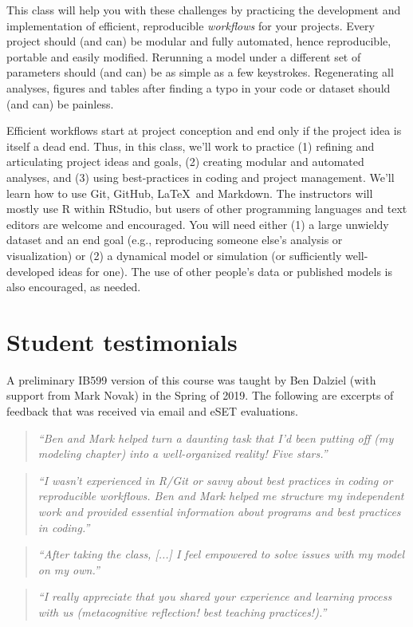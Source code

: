 \documentclass[10pt]{article}
\begin{document}
This class will help you with these challenges by practicing the development and implementation of efficient, reproducible \emph{workflows} for your projects.  Every project should (and can) be modular and fully automated, hence reproducible, portable and easily modified.  Rerunning a model under a different set of parameters should (and can) be as simple as a few keystrokes. Regenerating all analyses, figures and tables after finding a typo in your code or dataset should (and can) be painless.

Efficient workflows start at project conception and end only if the project idea is itself a dead end.  Thus, in this class, we'll work to practice (1) refining and articulating project ideas and goals, (2) creating modular and automated analyses, and (3) using best-practices in coding and project management. We'll learn how to use Git, GitHub, \LaTeX\, and Markdown.  The instructors will mostly use \textsf{R} within RStudio, but users of other programming languages and text editors are welcome and encouraged.  You will need either (1) a large unwieldy dataset and an end goal (e.g., reproducing someone else's analysis or visualization) or (2) a dynamical model or simulation (or sufficiently well-developed ideas for one).  The use of other people's data or published models is also encouraged, as needed.

\section*{Student testimonials}
A preliminary IB599 version of this course was taught by Ben Dalziel (with support from Mark Novak) in the Spring of 2019.  The following are excerpts of feedback that was received via email and eSET evaluations.

\begin{quote}
\emph{``Ben and Mark helped turn a daunting task that I'd been putting off (my modeling chapter) into a well-organized reality! Five stars.''}
\end{quote}
\begin{quote}
	\emph{``I wasn't experienced in R/Git or savvy about best practices in coding or reproducible workflows. Ben and Mark helped me structure my independent work and provided essential information about programs and best practices in coding.''}
\end{quote}
\begin{quote}
	\emph{``After taking the class, [...] I feel empowered to solve issues with my model on my own.''}
\end{quote}
\begin{quote}
	\emph{``I really appreciate that you shared your experience and learning process with us (metacognitive reflection! best teaching practices!).''}
\end{quote}
\end{document}

